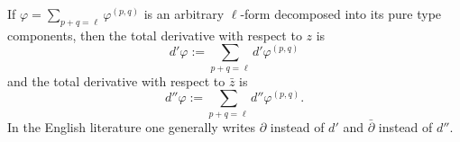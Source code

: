 If $\varphi = \sum_{p+q=\ell} \varphi^{(p,q)}$ is an arbitrary $\ell$-form decomposed into its pure type components, then the total derivative with respect to $z$ is
$$d' \varphi := \sum_{p+q=\ell} d' \varphi^{(p,q)}$$
and the total derivative with respect to $\bar{z}$ is
$$d'' \varphi := \sum_{p+q=\ell} d'' \varphi^{(p,q)}.$$
In the English literature one generally writes $\partial$ instead of $d'$ and $\bar{\partial}$ instead of $d''$.

